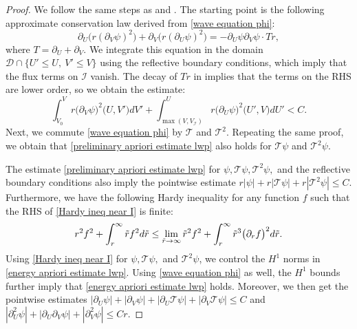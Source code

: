 \documentclass[11pt]{article}
\numberwithin{equation}{section}
\begin{document}
\begin{proof}
    We follow the same steps as \cite{holzegellinear} and \cite[Proposition~6.4]{localwellposed}. The starting point is the following approximate conservation law derived from \eqref{wave equation phi}:
    \[\partial_U\Big(r(\partial_V\psi)^2\Big)+\partial_V\Big(r(\partial_U\psi)^2\Big)=-\partial_U\psi\partial_V\psi\cdot Tr,\]
    where $T=\partial_U+\partial_V.$ We integrate this equation in the domain $\mathcal{D}\cap\big\{U'\leq U,\ V'\leq V\big\}$ using the reflective boundary conditions, which imply that the flux terms on $\mathcal{I}$ vanish. The decay of $Tr$ in  implies that the terms on the RHS are lower order, so we obtain the estimate:
    \begin{equation}\label{preliminary apriori estimate lwp}
        \int_{V_0}^{V}r\big(\partial_V\psi\big)^2\big(U,V'\big)dV'+\int_{\max(V,V_{\mathcal{I}})}^{U}r\big(\partial_U\psi\big)^2\big(U',V\big)dU'<C.
    \end{equation}
    Next, we commute \eqref{wave equation phi} by $\mathcal{T}$ and $\mathcal{T}^2$. Repeating the same proof, we obtain that \eqref{preliminary apriori estimate lwp} also holds for $\mathcal{T}\psi$ and $\mathcal{T}^2\psi.$

    The estimate \eqref{preliminary apriori estimate lwp} for $\psi,\mathcal{T}\psi,\mathcal{T}^2\psi,$ and the reflective boundary conditions also imply the pointwise estimate $r|\psi|+r|\mathcal{T}\psi|+r|\mathcal{T}^2\psi|\leq C.$ Furthermore, we have the following Hardy inequality for any function $f$ such that the RHS of \eqref{Hardy ineq near I} is finite:
    \begin{equation}\label{Hardy ineq near I}
        r^2f^2+\int_r^{\infty}\Tilde{r}f^2d\Tilde{r}\leq\lim_{\Tilde{r}\rightarrow\infty}\Tilde{r}^2f^2+\int_r^{\infty}\Tilde{r}^3\big(\partial_rf\big)^2d\Tilde{r}.
    \end{equation}
    Using \eqref{Hardy ineq near I} for $\psi,\mathcal{T}\psi,$ and $\mathcal{T}^2\psi$, we control the $H^1$ norms in \eqref{energy apriori estimate lwp}. Using \eqref{wave equation phi} as well, the $H^1$ bounds further imply that \eqref{energy apriori estimate lwp} holds. Moreover, we then get the pointwise estimates $|\partial_U\psi|+|\partial_V\psi|+|\partial_U\mathcal{T}\psi|+|\partial_V\mathcal{T}\psi|\leq C$ and $|\partial_U^2\psi|+|\partial_U\partial_V\psi|+|\partial_V^2\psi|\leq Cr.$


\end{proof}
\end{document}
